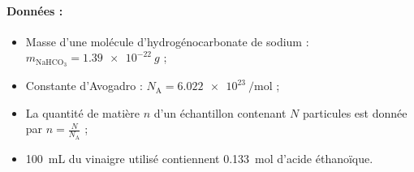 \documentclass[12pt,a4paper,fleqn]{article}
\begin{document}
\begin{appel}
\val{}
\end{appel}

\paragraph{Données :}
\begin{itemize}
\item Masse d'une \og molécule \fg{} d'hydrogénocarbonate de sodium : $m_\mathrm{NaHCO_3} = \qty{1.39e-22}{g}$ ;
\item Constante d'Avogadro : $N_\mathrm{A} = \qty[per-mode=power]{6,022e23}{\per\mole}$ ;
\item La quantité de matière $n$ d'un échantillon contenant $N$ particules est donnée par $n=\frac{N}{N_\mathrm{A}}$ ;
\item \qty{100}{mL} du vinaigre utilisé contiennent \qty{0,133}{\mole} d'acide éthanoïque.
\end{itemize}
\end{document}
